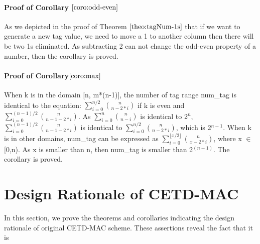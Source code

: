 \documentclass{article}
\begin{document}
\paragraph{Proof of Corollary $\ref{coro:odd-even}$}
As we depicted in the proof of Theorem $\ref{theo:tagNum-1s}$ that if we want to generate a new tag value, we need to move a 1 to another column then there will be two 1s eliminated. As subtracting 2 can not change the odd-even property of a number, then the corollary is proved.
\paragraph{Proof of Corollary$\ref{coro:max}$}
When k is in the domain [n, m*(n-1)], the number of tag range num\_tag is identical to the equation: $\sum_{i=0}^{n/2} \binom{n}{n-2*i}$ if k is even and $\sum_{i=0}^{(n-1)/2} \binom{n}{n-1-2*i}$. As $\sum_{i=0}^{n} \binom{n}{n-i}$ is identical to 2$^n$, $\sum_{i=0}^{(n-1)/2} \binom{n}{n-1-2*i}$ is identical to $\sum_{i=0}^{n/2} \binom{n}{n-2*i}$, which is 2$^{n-1}$. 
When k is in other domains, num\_tag can be expressed as $\sum_{i=0}^{\lfloor x/2 \rfloor} \binom{n}{x-2*i}$, where x $\in$ [0,n). As x is smaller than n, then num\_tag is smaller than 2$^(n-1)$. The corollary is proved. 

\section{Design Rationale of CETD-MAC}
In this section, we prove the theorems and corollaries indicating the design rationale of original CETD-MAC scheme. These assertions reveal the fact that it is 
\end{document}
